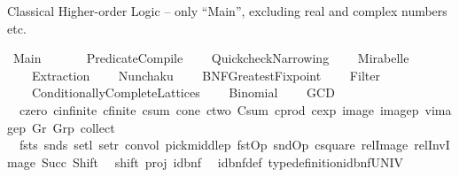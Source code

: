 %
\begin{isabellebody}%
%
%
\isadelimdocument
%
\endisadelimdocument
%
\isatagdocument
%
\isamarkuptrue%
%
\endisatagdocument
{\isafolddocument}%
%
\isadelimdocument
%
\endisadelimdocument
%
\begin{isamarkuptext}%
Classical Higher-order Logic -- only ``Main'', excluding real and
  complex numbers etc.%
\end{isamarkuptext}\isamarkuptrue%
%
\isadelimtheory
%
\endisadelimtheory
%
\isatagtheory
{}\isamarkupfalse%
\ Main\isanewline
\ \ \isanewline
\ \ \ \ Predicate{\isacharunderscore}{\kern0pt}Compile\isanewline
\ \ \ \ Quickcheck{\isacharunderscore}{\kern0pt}Narrowing\isanewline
\ \ \ \ Mirabelle\isanewline
\ \ \ \ Extraction\isanewline
\ \ \ \ Nunchaku\isanewline
\ \ \ \ BNF{\isacharunderscore}{\kern0pt}Greatest{\isacharunderscore}{\kern0pt}Fixpoint\isanewline
\ \ \ \ Filter\isanewline
\ \ \ \ Conditionally{\isacharunderscore}{\kern0pt}Complete{\isacharunderscore}{\kern0pt}Lattices\isanewline
\ \ \ \ Binomial\isanewline
\ \ \ \ GCD\isanewline
{}%
\endisatagtheory
{\isafoldtheory}%
%
\isadelimtheory
%
\endisadelimtheory
%
\isadelimdocument
%
\endisadelimdocument
%
\isatagdocument
%
\isamarkuptrue%
%
\endisatagdocument
{\isafolddocument}%
%
\isadelimdocument
%
\endisadelimdocument
{}\isamarkupfalse%
\ {\isacharparenleft}{\kern0pt}\isanewline
\ \ czero\ cinfinite\ cfinite\ csum\ cone\ ctwo\ Csum\ cprod\ cexp\ image{}\ image{}p\ vimage{}p\ Gr\ Grp\ collect\isanewline
\ \ fsts\ snds\ setl\ setr\ convol\ pick{\isacharunderscore}{\kern0pt}middlep\ fstOp\ sndOp\ csquare\ relImage\ relInvImage\ Succ\ Shift\isanewline
\ \ shift\ proj\ id{\isacharunderscore}{\kern0pt}bnf\isanewline
\isanewline
{}\isamarkupfalse%
\ {\isacharparenleft}{\kern0pt}\ id{\isacharunderscore}{\kern0pt}bnf{\isacharunderscore}{\kern0pt}def\ type{\isacharunderscore}{\kern0pt}definition{\isacharunderscore}{\kern0pt}id{\isacharunderscore}{\kern0pt}bnf{\isacharunderscore}{\kern0pt}UNIV%
\isadelimdocument
%
\endisadelimdocument
%
\isatagdocument
%
\isamarkuptrue%
%
\endisatagdocument
{\isafolddocument}%
%
\isadelimdocument
%
\endisadelimdocument
{}\isamarkupfalse%

\end{isabellebody}
